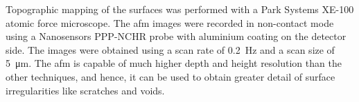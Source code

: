 

Topographic mapping of the surfaces was performed with a Park Systems XE-100 atomic force microscope. The \ac{afm} images were recorded in non-contact mode using a Nanosensors PPP-NCHR probe with aluminium coating on the detector side. The images were obtained using a scan rate of \SI{0.2}{\hertz} and a scan size of \SI{5}{\micro\metre}. The \ac{afm} is capable of much higher depth and height resolution than the other techniques, and hence, it can be used to obtain greater detail of surface irregularities like scratches and voids.

